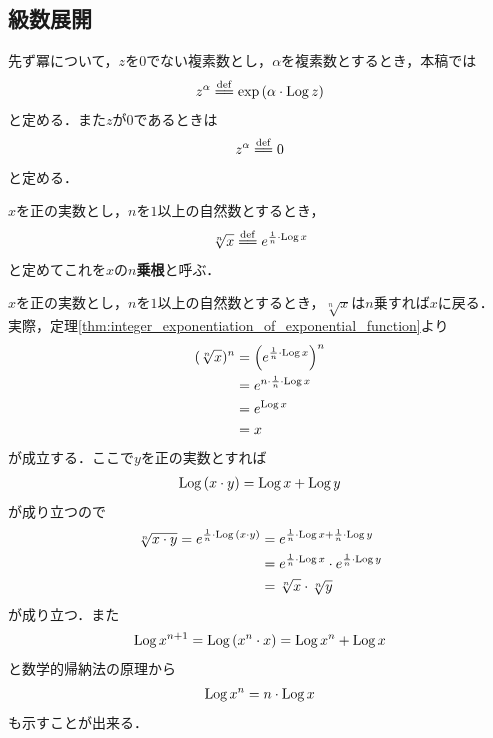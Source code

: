 \subsection{級数展開}
	
	先ず冪について，$z$を$0$でない複素数とし，$\alpha$を複素数とするとき，本稿では
	\begin{align}
		z^{\alpha} \defeq \exp{(\alpha \cdot \pvlog{z})}
	\end{align}
	と定める．また$z$が$0$であるときは
	\begin{align}
		z^{\alpha} \defeq 0
	\end{align}
	と定める．
	
	\begin{screen}
		\begin{dfn}[冪根]
			$x$を正の実数とし，$n$を$1$以上の自然数とするとき，
			\begin{align}
				\sqrt[n]{x} \defeq e^{\frac{1}{n} \cdot \pvlog{x}}
			\end{align}
			と定めてこれを$x$の{\bf $n$乗根}と呼ぶ．
		\end{dfn}
	\end{screen}
	
	$x$を正の実数とし，$n$を$1$以上の自然数とするとき，$\sqrt[n]{x}$は$n$乗すれば$x$に戻る．
	実際，定理\ref{thm:integer_exponentiation_of_exponential_function}より
	\begin{align}
		(\sqrt[n]{x})^{n} &= \left(e^{\frac{1}{n} \cdot \operatorname{Log}{x}}\right)^{n} \\
		&= e^{n \cdot \frac{1}{n} \cdot \operatorname{Log}{x}} \\
		&= e^{\operatorname{Log}{x}} \\
		&= x
	\end{align}
	が成立する．ここで$y$を正の実数とすれば
	\begin{align}
		\operatorname{Log}{(x \cdot y)} = \operatorname{Log}{x} + \operatorname{Log}{y}
	\end{align}
	が成り立つので
	\begin{align}
		\sqrt[n]{x \cdot y} = e^{\frac{1}{n} \cdot \operatorname{Log}{(x \cdot y)}}
		&= e^{\frac{1}{n} \cdot \operatorname{Log}{x} + \frac{1}{n} \cdot \operatorname{Log}{y}} \\
		&= e^{\frac{1}{n} \cdot \operatorname{Log}{x}} \cdot e^{\frac{1}{n} \cdot \operatorname{Log}{y}} \\
		&= \sqrt[n]{x} \cdot \sqrt[n]{y}
	\end{align}
	が成り立つ．また
	\begin{align}
		\operatorname{Log}{x^{n+1}} = \operatorname{Log}{(x^{n} \cdot x)} = \operatorname{Log}{x^{n}} + \operatorname{Log}{x}
	\end{align}
	と数学的帰納法の原理から
	\begin{align}
		\operatorname{Log}{x^{n}} = n \cdot \operatorname{Log}{x}
	\end{align}
	も示すことが出来る．
	
